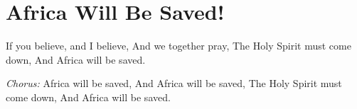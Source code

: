 \starttocol
\chapter{Africa Will Be Saved!}
\nexttocol
\hfill{\it }
\stoptocol
\starttocol
\startlines
{\sc If} you believe, and I believe,
And we together pray,
The Holy Spirit must come down,
And Africa will be saved.

{\it Chorus: }
Africa will be saved,
And Africa will be saved,
The Holy Spirit must come down,
And Africa will be saved.
\stoplines
\nexttocol

\stoptocol
